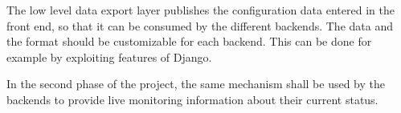 The low level data export layer publishes the configuration data entered in the front end, so that it can be consumed by the different backends.
The data and the format should be customizable for each backend. 
This can be done for example by exploiting features of Django.  

In the second phase of the project, the same mechanism shall be used by the backends to provide live monitoring information about their current status.


